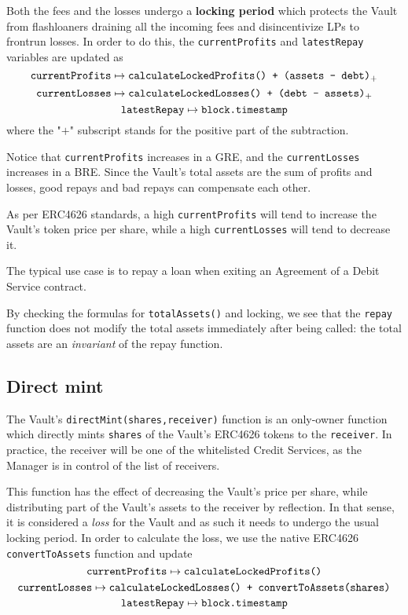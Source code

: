 \documentclass[a4paper,10 pt]{article}
\theoremstyle{definition}
\begin{document}
Both the fees and the losses undergo a {\bf locking period} which protects the Vault from flashloaners draining all the incoming fees and disincentivize LPs to frontrun losses. In order to do this, the \verb|currentProfits| and \verb|latestRepay| variables are updated as 
$$\verb|currentProfits| \mapsto \verb|calculateLockedProfits() + (assets - debt)|_+$$ 
$$\verb|currentLosses| \mapsto \verb|calculateLockedLosses() + (debt - assets)|_+$$ 
$$\verb|latestRepay| \mapsto \verb|block.timestamp|$$ 
where the "$+$" subscript stands for the positive part of the subtraction.

Notice that \verb|currentProfits| increases in a GRE, and the \verb|currentLosses| increases in a BRE. Since the Vault's total assets are the sum of profits and losses, good repays and bad repays can compensate each other.

As per ERC4626 standards, a high \verb|currentProfits| will tend to increase the Vault's token price per share, while a high \verb|currentLosses| will tend to decrease it.

The typical use case is to repay a loan when exiting an Agreement of a Debit Service contract.

By checking the formulas for \verb|totalAssets()| and locking, we see that the \verb|repay| function does not modify the total assets immediately after being called: the total assets are an {\it invariant} of the repay function.

\subsection{Direct mint}\label{directMint}
The Vault's \verb|directMint(shares,receiver)| function is an only-owner function which directly mints \verb|shares| of the Vault's ERC4626 tokens to the \verb|receiver|. In practice, the receiver will be one of the whitelisted Credit Services, as the Manager is in control of the list of receivers.

This function has the effect of decreasing the Vault's price per share, while distributing part of the Vault's assets to the receiver by reflection. In that sense, it is considered a {\it loss} for the Vault and as such it needs to undergo the usual locking period. In order to calculate the loss, we use the native ERC4626 \verb|convertToAssets| function and update 
$$\verb|currentProfits| \mapsto \verb|calculateLockedProfits()|$$ 
$$\verb|currentLosses| \mapsto \verb|calculateLockedLosses() + convertToAssets(shares)|$$ 
$$\verb|latestRepay| \mapsto \verb|block.timestamp|$$
\end{document}
